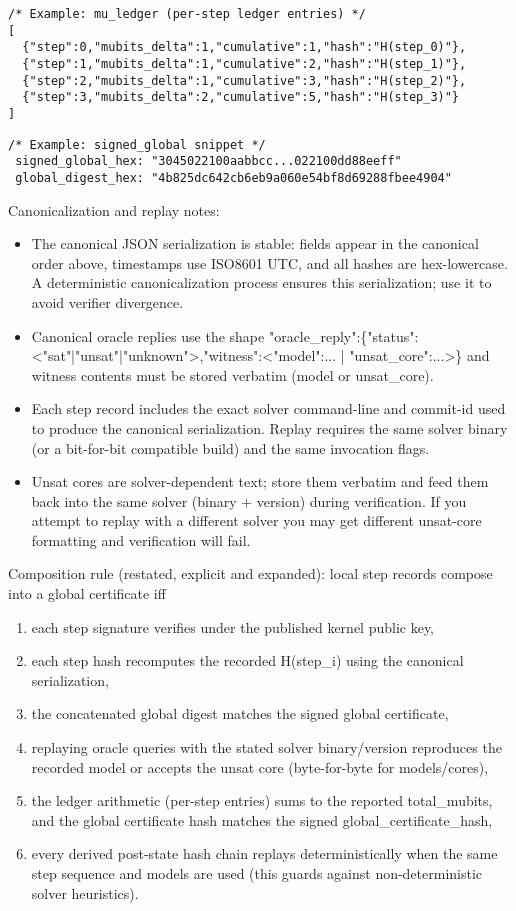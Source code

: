 \documentclass[11pt]{article}
\begin{document}
\begin{verbatim}
/* Example: mu_ledger (per-step ledger entries) */
[
  {"step":0,"mubits_delta":1,"cumulative":1,"hash":"H(step_0)"},
  {"step":1,"mubits_delta":1,"cumulative":2,"hash":"H(step_1)"},
  {"step":2,"mubits_delta":1,"cumulative":3,"hash":"H(step_2)"},
  {"step":3,"mubits_delta":2,"cumulative":5,"hash":"H(step_3)"}
]
\end{verbatim}

\begin{verbatim}
/* Example: signed_global snippet */
 signed_global_hex: "3045022100aabbcc...022100dd88eeff"
 global_digest_hex: "4b825dc642cb6eb9a060e54bf8d69288fbee4904"
\end{verbatim}

Canonicalization and replay notes:
\begin{itemize}
  \item The canonical JSON serialization is stable: fields appear in the canonical order above, timestamps use ISO8601 UTC, and all hashes are hex-lowercase. A deterministic canonicalization process ensures this serialization; use it to avoid verifier divergence.
  \item Canonical oracle replies use the shape "oracle_reply":\{"status":<"sat"|"unsat"|"unknown">,"witness":<{"model":...} | {"unsat_core":...}>\} and witness contents must be stored verbatim (model or unsat_core).
  \item Each step record includes the exact solver command-line and commit-id used to produce the canonical serialization. Replay requires the same solver binary (or a bit-for-bit compatible build) and the same invocation flags.
  \item Unsat cores are solver-dependent text; store them verbatim and feed them back into the same solver (binary + version) during verification. If you attempt to replay with a different solver you may get different unsat-core formatting and verification will fail.
\end{itemize}

Composition rule (restated, explicit and expanded): local step records compose into a global certificate iff
\begin{enumerate}
  \item each step signature verifies under the published kernel public key,
  \item each step hash recomputes the recorded H(step\_i) using the canonical serialization,
  \item the concatenated global digest matches the signed global certificate,
  \item replaying oracle queries with the stated solver binary/version reproduces the recorded model or accepts the unsat core (byte-for-byte for models/cores),
  \item the ledger arithmetic (per-step entries) sums to the reported total_mubits, and the global certificate hash matches the signed global_certificate_hash,
  \item every derived post-state hash chain replays deterministically when the same step sequence and models are used (this guards against non-deterministic solver heuristics).
\end{enumerate}
\end{document}
